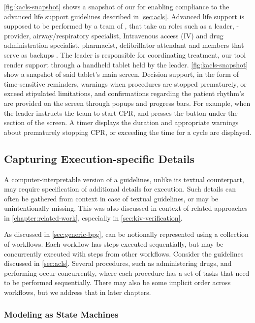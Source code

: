 \autoref{fig:kacls-snapshot} shows a snapshot of our \CDSS{} for
enabling compliance to the advanced life support guidelines described in
\autoref{sec:acls}. Advanced life support is supposed to be performed by
a team of \HCPs{}, that take on roles such as a leader, \CPR{}-provider,
airway/respiratory specialist, Intravenous access (IV) and drug administration
specialist, pharmacist, defibrillator attendant and members that serve as
backups \cite{ACLSWikiEntry}. The leader is responsible for coordinating
treatment, our tool render support through a handheld tablet held by the leader.
\autoref{fig:kacls-snapshot} show a snapshot of said tablet's main screen.
Decision support, in the form of time-sensitive reminders, warnings when
procedures are stopped prematurely, or exceed stipulated limitations, and
confirmations regarding the patient rhythm's are provided on the screen
through popups and progress bars. For example, when the leader instructs
the team to start CPR, and presses the  button under the 
section of the screen. A timer displays the duration and appropriate warnings
about prematurely stopping CPR, or exceeding the time for a \CPR{} cycle are
displayed.

\subsection{Capturing Execution-specific Details}\label{sec:execution-specific-details}

A computer-interpretable version of a guidelines, unlike its
textual counterpart, may require specification of additional details
for execution. Such details can often be gathered from context in case
of textual guidelines, or may be unintentionally missing. This was also
discussed in context of related approaches in \autoref{chapter:related-work},
especially in \autoref{sec:kiv-verification}.

As discussed in \autoref{sec:generic-bpg}, \BPGs{} can be notionally
represented using a collection of workflows. Each workflow has steps
executed sequentially, but may be concurrently executed with steps from
other workflows. Consider the \ACLS{} guidelines discussed in
\autoref{sec:acls}. Several procedures, such as administering drugs,
and performing \CPR{} occur concurrently, where each procedure has
a set of tasks that need to be performed sequentially.
There may also be some implicit order across workflows, but we
address that in later chapters.

\subsubsection{Modeling \BPGs{} as State Machines}

